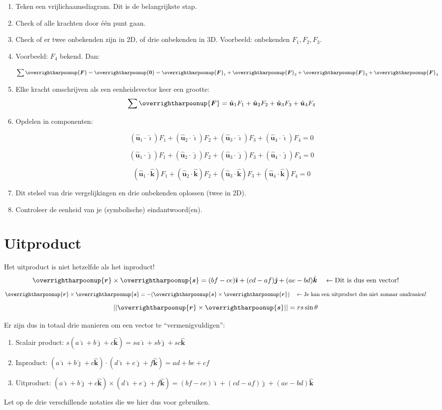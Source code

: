 \documentclass{article}
\renewcommand{\v}[1]{\overrightharpoonup{\bm{#1}}}
\renewcommand{\u}[1]{\hat{\bm{#1}}}
\newcommand{\F}{\v{F}}
\renewcommand{\i}{\hat{\bm{\imath}}}
\renewcommand{\j}{\hat{\bm{\jmath}}}
\renewcommand{\k}{\u{k}}
\begin{document}
\begin{enumerate}
    \item Teken een vrijlichaamsdiagram. Dit is de belangrijkste stap.
    \item Check of alle krachten door één punt gaan.
    \item Check of er twee onbekenden zijn in 2D, of drie onbekenden in 3D. Voorbeeld: onbekenden $F_1, F_2, F_3$.
    \item Voorbeeld: $F_4$ bekend. Dan:

    $$ \sum\F = \v{0} = \F_1 + \F_2 + \F_3 + \F_4$$

    \item Elke kracht omschrijven als een eenheidsvector keer een grootte:
    $$\sum\F  = \u{u}_1F_1 + \u{u}_2F_2 + \u{u}_3F_3 + \u{u}_4F_4$$

    \item Opdelen in componenten:

    $$ (\u{u}_1\cdot\i) F_1 + (\u{u}_2\cdot\i) F_2 + (\u{u}_3\cdot\i) F_3 + (\u{u}_4\cdot\i) F_4 = 0$$

    $$ (\u{u}_1\cdot\j) F_1 + (\u{u}_2\cdot\j) F_2 + (\u{u}_3\cdot\j) F_3 + (\u{u}_4\cdot\j) F_4 = 0$$

    $$ (\u{u}_1\cdot\k) F_1 + (\u{u}_2\cdot\k) F_2 + (\u{u}_3\cdot\k) F_3 + (\u{u}_4\cdot\k) F_4 = 0$$

    \item Dit stelsel van drie vergelijkingen en drie onbekenden oplossen (twee in 2D).
    \item Controleer de eenheid van je (symbolische) eindantwoord(en).
\end{enumerate}

\section{Uitproduct}
Het uitproduct is niet hetzelfde als het inproduct!
$$ \v{r} \times \v{s}= (bf-ce)\i + (cd-af)\j+ (ae-bd)\k \quad\leftarrow\text{Dit is dus een vector!}$$
$$\v{r} \times \v{s} = -(\v{s} \times \v{r}) \quad\leftarrow\text{Je kan een uitproduct dus niet zomaar omdraaien!}$$
$$||\v{r}\times\v{s}||=rs\sin\theta$$

Er zijn dus in totaal drie manieren om een vector te ``vermenigvuldigen'': 
\begin{enumerate}
    \item Scalair product: $s(a\i+b\j+c\k) = sa\i + sb\j +sc\k$
    \item Inproduct: $(a\i+b\j+c\k)\cdot(d\i+e\j+f\k)=ad+be+cf$
    \item Uitproduct: $(a\i+b\j+c\k)\times(d\i+e\j+f\k)=(bf-ce)\i+(cd-af)\j+(ae-bd)\k$
\end{enumerate}
Let op de drie verschillende notaties die we hier dus voor gebruiken.
\end{document}
